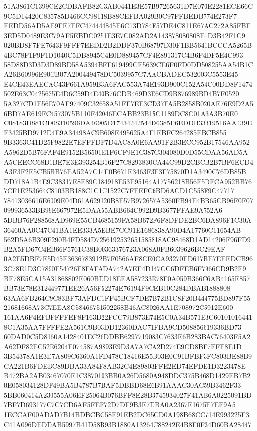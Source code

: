 \documentclass[UTF8,fontset=fandol,zihao=-4,a4paper]{ctexart}
\begin{document}
{{51A3861C1399CE2CDBAFB82C3AB0441E3E57B97265631D7E070E2281ECE66C9C5D14420C835785D466CC98118B88CEFBA029B0C97FFBEDB774E273F7
EEDD56AD5AE9FE7FFC474444845E6C13D784F57DE4C811E67AC272A85FBF3ED5D0489E3C79AF5EBDC0251E3E7C082AD2A143878080808E1D3B42F1C9
020BD8F7FE7643F9FFF7EEDD2B2DDF370B68797D30F1BB5641BCCCA5265B4BC78F1F9F1D1040C5DB8945C4E0D889457CF4E891317C4B6F4DF5E4C993
58D88D3D3D3D89BD58A5394BFF619499CE5639CE6F0FD0DD508255AA54B1CA26B60996E90CB07A200449478DC5039957C7AACBADEC532003C5553E45
E4CE43EAECAC43F661A959B3A6FAC553A74E193D900C152A54C00DD8F1474502E63C0425635E4D6C59D4E40B76CDB469D3E6CD9B876989BD4B7F0520
5A327CD1E56E70AF97409C32658A51FF7EF3CD37FA5B2858B020AE76E9D2A56BD7AE619FC4573075B110F42046ECABB23B15C1189DC8C01A3A3B70E0
C08183D881CD08310596DA46905D17434242544D6385F6EDDB33319516AA439EF3425BD9712D4E9A34498AC9B608E495625A4F1EBFC264285EBCB855
9B3363C41D25F9822E7EFFFDF7D4AC8A0E6AA91F2B3ECC952B17546AA952A5962D5B76FAF4E9152B56501E1F6CF9E1C387C304080D0D55CDAA56AD5A
A5CEECC68D1BE7E3E393254B16F27C8293830CA44C99D2CBCB2B7BF6ECD4A3F3F2E5CB5BB76EA52A7C14F0B671E3463F3F3F75870D1A3490C76DB85B
DD718A1B4E9C38317E8E89C184918E53E95164A17756218B56F5DFCA952BB767CF1E253664C8103BB188C1C1C1522C7FFEFC6BD6ACD1C558F9C47717
78413036616E6009E04D61A629120B8E57B972657A5360FB94E4BB65CB96F0F07099936533BB99E667972E5DAA55ABB664C992D9B3677FFAE9A752A6
5DBB76F288568AD969E55CB4685159FA58B672F6F8DFDE2BC6DA896F1C30A36460AA0C47C41BA1EE333A5EBE7CC91E1686838A90D4A17760C11654AB
562D5A6B309F290B4FD584D7256192532651585818AC98468D1AD14206F96FD9B2A5FD67C4EB66F5761C38B00363376723A068A0FB6039626BC29EAF
0A2E5DBF7E5D45E3636783912B7F0566AF8CE0CA93270FD617BE7EEEDCB963C78E1D3C7890F54726F8FAFADA742A7EF4D147CC6DFEB6F7966CD9B2E9
BF78E5CA15A31868802E060BDD18EEA587233E78F0A059B366C6AB4165E857BB73E78E312449771EE26A56F52274E76194F9CEB10C284DBAB1888808
63AA6FB264C9C83BF73AFDC1FF45BCF7DE7B72B1C8F20B444775BD897F5521681668A73C7EEA8C58466751502258B46AC8026AA1E708972C5912E600
161AA6F4EFBFFFFEF8F163D22FCC79B873E74E5C0A34B571E3C601010164418C1A35AA7FFFFE2A561C9B03DD12360DAC71FBA9CD508856619336BD73
60DAD0C5D8160A1428401EC26DDBB6297719083C7633E6B283BAC76403F5A2A62DF82EC52E6204F074587A9893E9D3A7A7CA2D274E9CD8BF7FFF8E1D
3B54378A1E3D7A809C6360A1FD478C18416E55B03E0C91BFBF3FC803BE88B9CA221B6FDEBC89DBA33A84F8AB32C4E89803FFE2ED74EFDE1D3223478E
B472BA2AB03467070E1C3870103BB0A26D5680A948DDC375B468D1429EB7B20E058034128DF49BA5B4787B7BAF5DBBD68E6B91AAAC30AC59B3462F33
5BB060414A230555A06EF25064B076BFF8E28B3745934027F41AB6A0225091BD7BF7D693177C7C7CD6AF5FEF72D7DF9B3E7DBA0A2367E1675F7EF9A5
1ECCAF00ADAD7B14BDBCBC58E91EB2DC65CD0A198B68CC714E993225F3C41A096DEDDAB5997B41D58B93B1880A13264C88242E4B8F0F34D60BA28447
}}
\end{document}
